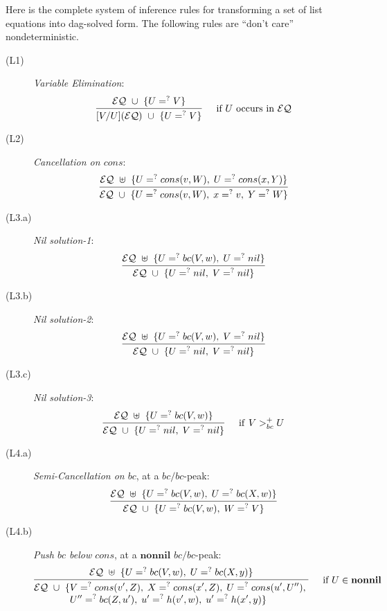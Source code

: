 \documentclass[11pt]{article}
\newcommand{\ueq}{=_{}^?}
\newcommand{\EQ}{\mathcal{EQ}}
\newcommand{\Nonnil}{\mathbf{nonnil}}
\begin{document}
Here is the complete system of inference rules for transforming a set of list
equations into dag-solved form. The following rules are ``don't care''
nondeterministic.
\begin{description}
    \item[(L1)] {\em Variable Elimination}:
        \[\infer[\quad \text{if } U \text{ occurs in } \EQ ]
            {[V/U](\EQ) ~ \cup ~ \{U \ueq V\} }
            { \EQ ~ \cup ~ \{U \ueq V\} }
        \]

    \item[(L2)] {\em Cancellation on $cons$}:
        \[\infer
            {\EQ ~ \cup ~ \{ U \ueq cons(v, W), \; x \ueq v, \; Y \ueq W \}}
            {\EQ ~ \uplus ~ \{ U \ueq cons(v, W), \; U \ueq cons(x, Y) \}}
        \]

    \item[(L3.a)] {\em Nil solution-1}:
        \[\infer
            {\EQ ~ \cup ~ \{ U \ueq nil, \; V \ueq nil \}}
            {\EQ ~ \uplus ~ \{ U \ueq bc(V, w), \; U \ueq nil \}}
        \]

    \item[(L3.b)] {\em Nil solution-2}:
        \[\infer
            {\EQ ~ \cup ~ \{ U \ueq nil, \; V \ueq nil \}}
            {\EQ ~ \uplus ~ \{ U \ueq bc(V, w), \; V \ueq nil \}}
        \]

    \item[(L3.c)] {\em Nil solution-3}:
        \[\infer[\quad \mathrm{if} ~ V >_{bc}^{+} U ]
            {\EQ ~ \cup ~ \{ U \ueq nil, \; V \ueq nil \}}
            {\EQ ~ \uplus ~ \{ U \ueq bc(V, w) \}}
        \]

    \item[(L4.a)] {\em Semi-Cancellation on $bc$}, at a $bc/bc$-peak:
        \[\infer
            {\EQ ~ \cup ~ \{U \ueq bc(V, w), \; W \ueq V \}}
            {\EQ ~ \uplus ~ \{ U \ueq bc(V, w), \; U \ueq bc(X, w) \}}
        \]

    \item[(L4.b)] {\em Push $bc$ below $cons$}, at a $\mathbf{nonnil}$ $bc/bc$-peak:
        \[\infer[\quad \text{if } U \in \Nonnil]
            {\begin{aligned}
                \EQ ~ \cup ~ \{
                & V \ueq cons(v', Z), \; X \ueq cons(x', Z), \;
                  U \ueq cons(u', U''), \; \\[-4pt]
                & U'' \ueq bc(Z, u'), \; u' \ueq h(v', w), \; u' \ueq h(x', y) \}
            \end{aligned}}
            {\EQ ~ \uplus ~ \{ U \ueq bc(V, w), \; U \ueq bc(X, y) \}}
        \]


\end{description}
\end{document}
